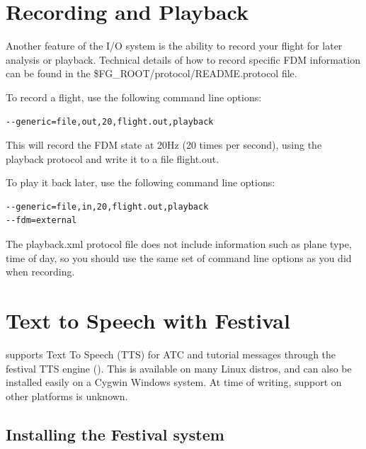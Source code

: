 \section{Recording and Playback}

Another feature of the I/O system is the ability to record your flight for
later analysis or playback. Technical details of how to record specific FDM
information can be found in the \$FG\_ROOT/protocol/README.protocol file.

To record a flight, use the following command line options:

\begin{verbatim}
--generic=file,out,20,flight.out,playback
\end{verbatim}

This will record the FDM state at 20Hz (20 times per second), using the playback
protocol and write it to a file flight.out.

To play it back later, use the following command line options:

\begin{verbatim}
--generic=file,in,20,flight.out,playback
--fdm=external
\end{verbatim}

The playback.xml protocol file does not include information such as plane type,
time of day, so you should use the same set of command line options as you
did when recording.

\section{Text to Speech with Festival}

\FlightGear{} supports Text To Speech (TTS) for ATC and tutorial messages through the festival TTS
engine (). This is available on many Linux distros,
and can also be installed easily on a Cygwin
Windows system. At time of writing, support on other platforms is unknown.

\subsection{Installing the Festival system}

